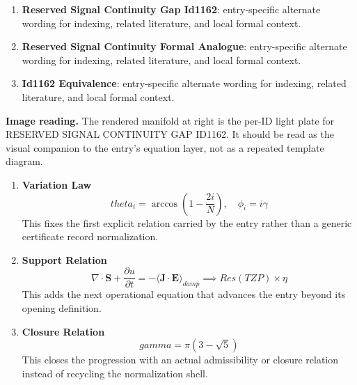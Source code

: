 \begin{enumerate}[leftmargin=1.6em,itemsep=6pt,topsep=4pt]
\item \textbf{Reserved Signal Continuity Gap Id1162}: entry-specific alternate wording for indexing, related literature, and local formal context.
\item \textbf{Reserved Signal Continuity Formal Analogue}: entry-specific alternate wording for indexing, related literature, and local formal context.
\item \textbf{Id1162 Equivalence}: entry-specific alternate wording for indexing, related literature, and local formal context.
\end{enumerate}

\begin{samepage}
\noindent\begin{minipage}[t]{0.45\linewidth}
\vspace{0pt}
\raggedright
\scriptsize\textbf{Image reading.} The rendered manifold at right is the per-ID light plate for RESERVED SIGNAL CONTINUITY GAP ID1162. It should be read as the visual companion to the entry's equation layer, not as a repeated template diagram.\par
\end{minipage}\hfill
\begin{minipage}[t]{0.53\linewidth}
\vspace*{-0.10in}
\raggedright
{}
\end{minipage}
\end{samepage}

\clearpage


\begin{enumerate}[leftmargin=1.6em,itemsep=9pt,topsep=6pt]
\item \textbf{Variation Law}
\[
theta_i = \arccos(1 - \frac{2i}{N}), \quad \phi_i = i\gamma
\]
This fixes the first explicit relation carried by the entry rather than a generic certificate record normalization.

\item \textbf{Support Relation}
\[
\nabla \cdot \mathbf{S} + \frac{\partial u}{\partial t} = -\langle \mathbf{J} \cdot \mathbf{E} \rangle_{damp} \implies Res(TZP) \times \eta
\]
This adds the next operational equation that advances the entry beyond its opening definition.

\item \textbf{Closure Relation}
\[
gamma = \pi(3-\sqrt{5})
\]
This closes the progression with an actual admissibility or closure relation instead of recycling the normalization shell.
\end{enumerate}

